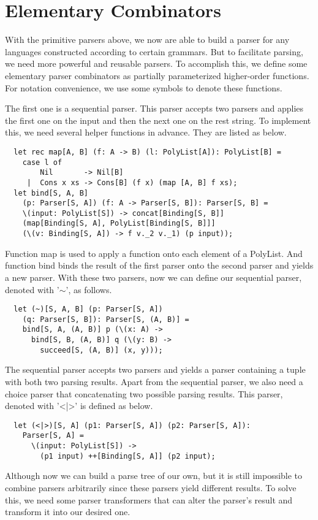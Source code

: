 \section{Elementary Combinators}
With the primitive parsers above, we now are able to build a parser for any languages constructed according to certain grammars. But to facilitate parsing, we need more powerful and reusable parsers. To accomplish this, we define some elementary parser combinators as partially parameterized higher-order functions. For notation convenience, we use some symbols to denote these functions.

The first one is a sequential parser. This parser accepts two parsers and applies the first one on the input and then the next one on the rest string. To implement this, we need several helper functions in advance. They are listed as below.
\begin{lstlisting}
  let rec map[A, B] (f: A -> B) (l: PolyList[A]): PolyList[B] =
    case l of
        Nil       -> Nil[B]
     |  Cons x xs -> Cons[B] (f x) (map [A, B] f xs);
  let bind[S, A, B] 
    (p: Parser[S, A]) (f: A -> Parser[S, B]): Parser[S, B] =
    \(input: PolyList[S]) -> concat[Binding[S, B]] 
    (map[Binding[S, A], PolyList[Binding[S, B]]] 
    (\(v: Binding[S, A]) -> f v._2 v._1) (p input));
\end{lstlisting}
Function map is used to apply a function onto each element of a PolyList. And function bind binds the result of the first parser onto the second parser and yields a new parser. With these two parsers, now we can define our sequential parser, denoted with '$\sim$', as follows.
\begin{lstlisting}
  let (~)[S, A, B] (p: Parser[S, A]) 
    (q: Parser[S, B]): Parser[S, (A, B)] =
	bind[S, A, (A, B)] p (\(x: A) -> 
	  bind[S, B, (A, B)] q (\(y: B) -> 
	    succeed[S, (A, B)] (x, y)));
\end{lstlisting}
The sequential parser accepts two parsers and yields a parser containing a tuple with both two parsing results. Apart from the sequential parser, we also need a choice parser that concatenating two possible parsing results. This parser, denoted with '<|>' is defined as below.
\begin{lstlisting}
  let (<|>)[S, A] (p1: Parser[S, A]) (p2: Parser[S, A]): 
    Parser[S, A] =
	  \(input: PolyList[S]) -> 
	    (p1 input) ++[Binding[S, A]] (p2 input);
\end{lstlisting}
Although now we can build a parse tree of our own, but it is still impossible to combine parsers arbitrarily since these parsers yield different results. To solve this, we need some parser transformers that can alter the parser's result and transform it into our desired one.

